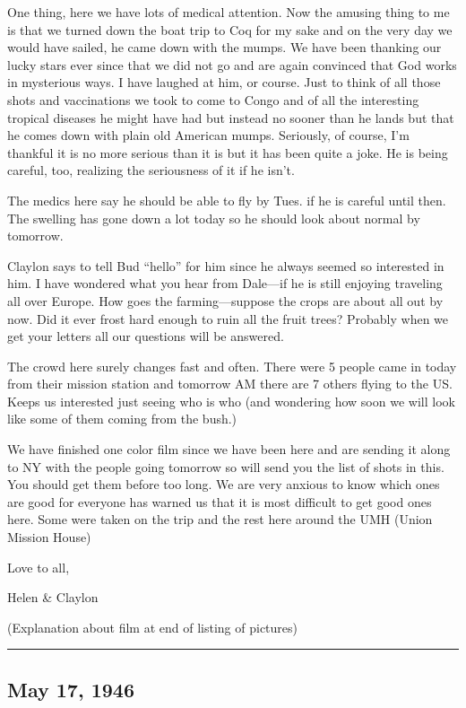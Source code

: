 \documentclass[
]{book}
\begin{document}
One thing, here we have lots of medical attention. Now the amusing thing to me is that we turned down the boat trip to Coq for my sake and on the very day we would have sailed, he came down with the mumps. We have been thanking our lucky stars ever since that we did not go and are again convinced that God works in mysterious ways. I have laughed at him, or course. Just to think of all those shots and vaccinations we took to come to Congo and of all the interesting tropical diseases he might have had but instead no sooner than he lands but that he comes down with plain old American mumps. Seriously, of course, I'm thankful it is no more serious than it is but it has been quite a joke. He is being careful, too, realizing the seriousness of it if he isn't.

The medics here say he should be able to fly by Tues. if he is careful until then. The swelling has gone down a lot today so he should look about normal by tomorrow.

Claylon says to tell Bud ``hello'' for him since he always seemed so interested in him. I have wondered what you hear from Dale---if he is still enjoying traveling all over Europe. How goes the farming---suppose the crops are about all out by now. Did it ever frost hard enough to ruin all the fruit trees? Probably when we get your letters all our questions will be answered.

The crowd here surely changes fast and often. There were 5 people came in today from their mission station and tomorrow AM there are 7 others flying to the US. Keeps us interested just seeing who is who (and wondering how soon we will look like some of them coming from the bush.)

We have finished one color film since we have been here and are sending it along to NY with the people going tomorrow so will send you the list of shots in this. You should get them before too long. We are very anxious to know which ones are good for everyone has warned us that it is most difficult to get good ones here. Some were taken on the trip and the rest here around the UMH (Union Mission House)

Love to all,

Helen \& Claylon

(Explanation about film at end of listing of pictures)

\begin{center}\rule{0.5\linewidth}{0.5pt}\end{center}

\hypertarget{may-17-1946}{%
\subsection{May 17, 1946}\label{may-17-1946}}
\end{document}
